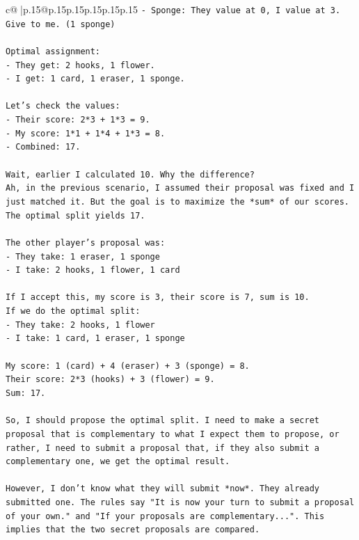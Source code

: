 \documentclass{article}
\begin{document}
{\begin{supertabular}{c@{$\;$}|p{.15\linewidth}@{}p{.15\linewidth}p{.15\linewidth}p{.15\linewidth}p{.15\linewidth}p{.15\linewidth}}
{{{\texttt{{-} Sponge: They value at 0, I value at 3. Give to me. (1 sponge)} \\
\\ 
\texttt{Optimal assignment:} \\
\texttt{{-} They get: 2 hooks, 1 flower.} \\
\texttt{{-} I get: 1 card, 1 eraser, 1 sponge.} \\
\\ 
\texttt{Let's check the values:} \\
\texttt{{-} Their score: 2*3 + 1*3 = 9.} \\
\texttt{{-} My score: 1*1 + 1*4 + 1*3 = 8.} \\
\texttt{{-} Combined: 17.} \\
\\ 
\texttt{Wait, earlier I calculated 10. Why the difference?} \\
\texttt{Ah, in the previous scenario, I assumed their proposal was fixed and I just matched it. But the goal is to maximize the *sum* of our scores. The optimal split yields 17.} \\
\\ 
\texttt{The other player's proposal was:} \\
\texttt{{-} They take: 1 eraser, 1 sponge} \\
\texttt{{-} I take: 2 hooks, 1 flower, 1 card} \\
\\ 
\texttt{If I accept this, my score is 3, their score is 7, sum is 10.} \\
\texttt{If we do the optimal split:} \\
\texttt{{-} They take: 2 hooks, 1 flower} \\
\texttt{{-} I take: 1 card, 1 eraser, 1 sponge} \\
\\ 
\texttt{My score: 1 (card) + 4 (eraser) + 3 (sponge) = 8.} \\
\texttt{Their score: 2*3 (hooks) + 3 (flower) = 9.} \\
\texttt{Sum: 17.} \\
\\ 
\texttt{So, I should propose the optimal split. I need to make a secret proposal that is complementary to what I expect them to propose, or rather, I need to submit a proposal that, if they also submit a complementary one, we get the optimal result.} \\
\\ 
\texttt{However, I don't know what they will submit *now*. They already submitted one. The rules say "It is now your turn to submit a proposal of your own." and "If your proposals are complementary...". This implies that the two secret proposals are compared.} \\
}}}
\end{supertabular}}
\end{document}
